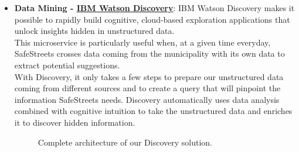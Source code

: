 \begin{itemize}
	\item \textbf{Data Mining - \href{https://cloud.ibm.com/catalog/services/discovery}{IBM Watson Discovery}}: IBM Watson Discovery makes it possible to rapidly build cognitive, cloud-based exploration applications that unlock insights hidden in unstructured data. 
	\\This microservice is particularly useful when, at a given time everyday, SafeStreets crosses data coming from the municipality with its own data to extract potential suggestions.
	\\With Discovery, it only takes a few steps to prepare our unstructured data coming from different sources and to create a query that will pinpoint the information SafeStreets needs. Discovery automatically uses data analysis combined with cognitive intuition to take the unstructured data and enriches it to discover hidden information.
	\begin{figure}[h!]
		\caption{Complete architecture of our Discovery solution.}
	\end{figure}
	\FloatBarrier
	

\end{itemize}
